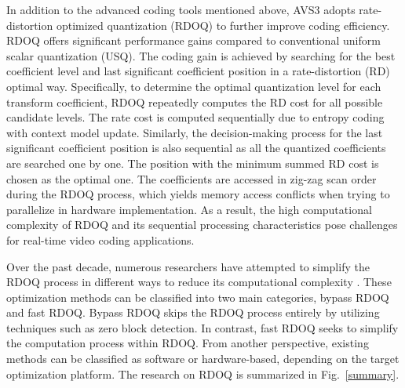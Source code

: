 \documentclass[lettersize,journal]{IEEEtran}
\begin{document}
\IEEEpubidadjcol

In addition to the advanced coding tools mentioned above, AVS3 adopts rate-distortion optimized quantization (RDOQ) to further improve coding efficiency. RDOQ offers significant performance gains compared to conventional uniform scalar quantization (USQ). The coding gain is achieved by searching for the best coefficient level and last significant coefficient position in a rate-distortion (RD) optimal way. Specifically, to determine the optimal quantization level for each transform coefficient, RDOQ repeatedly computes the RD cost for all possible candidate levels. The rate cost is computed sequentially due to entropy coding with context model update. Similarly, the decision-making process for the last significant coefficient position is also sequential as all the quantized coefficients are searched one by one. The position with the minimum summed RD cost is chosen as the optimal one. The coefficients are accessed in zig-zag scan order during the RDOQ process, which yields memory access conflicts when trying to parallelize in hardware implementation. As a result, the high computational complexity of RDOQ and its sequential processing characteristics pose challenges for real-time video coding applications. 

Over the past decade, numerous researchers have attempted to simplify the RDOQ process in different ways to reduce its computational complexity \cite{yin2014fasttrellis, wang2017fast, yin2019efficient, wang2021trellis}. These optimization methods can be classified into two main categories, bypass RDOQ and fast RDOQ. Bypass RDOQ skips the RDOQ process entirely by utilizing techniques such as zero block detection. In contrast, fast RDOQ seeks to simplify the computation process within RDOQ. From another perspective, existing methods can be classified as software or hardware-based, depending on the target optimization platform. The research on RDOQ is summarized in Fig.~\ref{summary}. 
\end{document}
